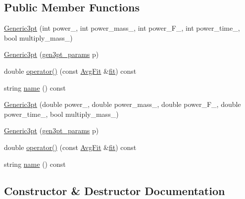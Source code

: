 \subsection*{Public Member Functions}
\begin{DoxyCompactItemize}
\item 
\mbox{\hyperlink{classGeneric3pt_a2ad0a31e7086a6f08fb8f148383e49c9}{Generic3pt}} (int power\+\_\+, int power\+\_\+mass\+\_\+, int power\+\_\+\+F\+\_\+, int power\+\_\+time\+\_\+, bool multiply\+\_\+mass\+\_\+)
\item 
\mbox{\hyperlink{classGeneric3pt_ae80fda20a523118353e7ccf5199a54a8}{Generic3pt}} (\mbox{\hyperlink{structgen3pt__params}{gen3pt\+\_\+params}} p)
\item 
double \mbox{\hyperlink{classGeneric3pt_ae10e73d761543be321a101ce1e57b49e}{operator()}} (const \mbox{\hyperlink{classAvgFit}{Avg\+Fit}} \&\mbox{\hyperlink{src_2lib_2three__point__timeslice__fitting_8h_aa079c61e69a3946e3351db64a3478612}{fit}}) const
\item 
string \mbox{\hyperlink{classGeneric3pt_a669b462af539bd13514447ed387f0644}{name}} () const
\item 
\mbox{\hyperlink{classGeneric3pt_a2c67116c08e611709658f4063e553fa1}{Generic3pt}} (double power\+\_\+, double power\+\_\+mass\+\_\+, double power\+\_\+\+F\+\_\+, double power\+\_\+time\+\_\+, bool multiply\+\_\+mass\+\_\+)
\item 
\mbox{\hyperlink{classGeneric3pt_ae80fda20a523118353e7ccf5199a54a8}{Generic3pt}} (\mbox{\hyperlink{structgen3pt__params}{gen3pt\+\_\+params}} p)
\item 
double \mbox{\hyperlink{classGeneric3pt_ae10e73d761543be321a101ce1e57b49e}{operator()}} (const \mbox{\hyperlink{classAvgFit}{Avg\+Fit}} \&\mbox{\hyperlink{src_2lib_2three__point__timeslice__fitting_8h_aa079c61e69a3946e3351db64a3478612}{fit}}) const
\item 
string \mbox{\hyperlink{classGeneric3pt_a669b462af539bd13514447ed387f0644}{name}} () const
\end{DoxyCompactItemize}


\subsection{Constructor \& Destructor Documentation}
\mbox{\label{classGeneric3pt_a2ad0a31e7086a6f08fb8f148383e49c9}} 
